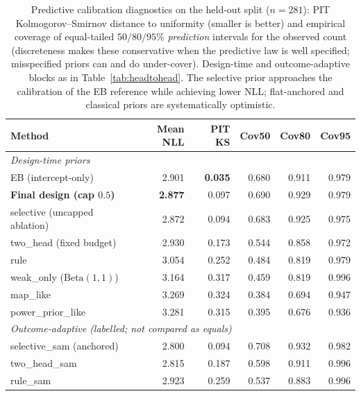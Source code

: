 \documentclass[11pt]{article}
\begin{document}
\begin{table}[htbp]
\centering
\caption{Predictive calibration diagnostics on the held-out split
($n=281$): PIT Kolmogorov--Smirnov distance to uniformity (smaller is better)
and empirical coverage of equal-tailed $50/80/95\%$ \emph{prediction}
intervals for the observed count (discreteness makes these conservative when
the predictive law is well specified; misspecified priors can and do
under-cover). Design-time and outcome-adaptive blocks as in
Table~\ref{tab:headtohead}. The selective prior approaches the calibration of
the EB reference while achieving lower NLL; flat-anchored and classical priors
are systematically optimistic.}
\label{tab:calib}
\begin{tabular}{lrrrrr}
\toprule
Method & Mean NLL & PIT KS & Cov50 & Cov80 & Cov95 \\
\midrule
\multicolumn{6}{l}{\emph{Design-time priors}}\\
EB (intercept-only) & 2.901 & \textbf{0.035} & 0.680 & 0.911 & 0.979 \\
\textbf{Final design (cap $0.5$)} & \textbf{2.877} & 0.097 & 0.690 & 0.929 & 0.979 \\
selective (uncapped ablation) & 2.872 & 0.094 & 0.683 & 0.925 & 0.975 \\
two\_head (fixed budget) & 2.930 & 0.173 & 0.544 & 0.858 & 0.972 \\
rule & 3.054 & 0.252 & 0.484 & 0.819 & 0.979 \\
weak\_only ($\mathrm{Beta}(1,1)$) & 3.164 & 0.317 & 0.459 & 0.819 & 0.996 \\
map\_like & 3.269 & 0.324 & 0.384 & 0.694 & 0.947 \\
power\_prior\_like & 3.281 & 0.315 & 0.395 & 0.676 & 0.936 \\
\midrule
\multicolumn{6}{l}{\emph{Outcome-adaptive (labelled; not compared as equals)}}\\
selective\_sam (anchored) & 2.800 & 0.094 & 0.708 & 0.932 & 0.982 \\
two\_head\_sam & 2.815 & 0.187 & 0.598 & 0.911 & 0.996 \\
rule\_sam & 2.923 & 0.259 & 0.537 & 0.883 & 0.996 \\
\bottomrule
\end{tabular}
\end{table}
\end{document}
